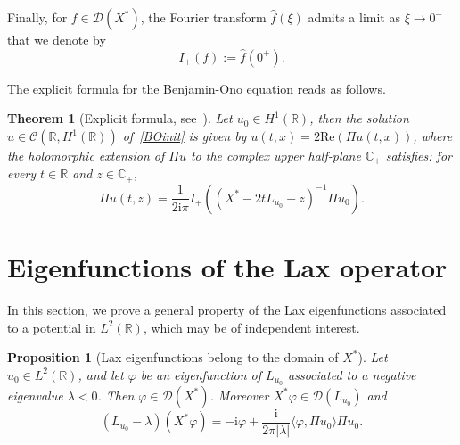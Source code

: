 \documentclass[english, 12pt]{amsart}%
\newcommand{\R}{\mathbb{R}}
\newcommand{\C}{\mathbb{C}}
\newcommand{\ii}{\mathrm{i}}
\renewcommand{\Re}{\mathrm{Re}}
\newtheorem{theorem}[definition]{Theorem}
\newtheorem{proposition}[definition]{Proposition}
\numberwithin{equation}{section}
\begin{document}
Finally, for $f\in\mathcal{D}(X^*)$, the Fourier transform $\widehat{f}(\xi)$ admits a limit as $\xi\to 0^+$ that we denote by
\[
I_+(f):=\widehat{f}(0^+).
\]

The explicit formula for the Benjamin-Ono equation reads as follows.

\begin{theorem}[Explicit formula, see~\cite{Gerard22}]
Let $u_0\in H^1(\R)$,  then the solution $u\in\mathcal{C}(\R,H^1(\R))$ of~\eqref{BOinit} is given by $u(t,x)=2\Re(\Pi u(t,x))$, where the holomorphic extension of $\Pi u$ to the complex upper half-plane $\C_+$ satisfies:  for every $t\in\R$ and $z\in\C_+$,
\begin{equation}\label{eq:explicit}
\Pi u(t,z)=\frac{1}{2\ii\pi}I_+((X^*-2tL_{u_0}-z)^{-1}\Pi u_0).
\end{equation}
\end{theorem}


\section{Eigenfunctions of the Lax operator}\label{sec:Lax}

In this section, we prove a general property of the Lax eigenfunctions associated to a potential in $L^2(\R)$, which may be of independent interest.

\begin{proposition}[Lax eigenfunctions belong to the domain of $X^*$]\label{prop:phi-domain}
Let $u_0\in L^2(\R)$, and let $\varphi$ be an eigenfunction of $L_{u_0}$ associated to a negative eigenvalue $\lambda<0$. Then $\varphi\in\mathcal{D}(X^*)$.
Moreover $X^*\varphi \in \mathcal {D}(L_{u_0})$ and 
\begin{equation}\label{eq:Xstarphi}
(L_{u_0}-\lambda)(X^*\varphi )=-\ii\varphi +\frac{\ii}{2\pi |\lambda|}\langle \varphi ,\Pi u_0\rangle \Pi u_0.
\end{equation}
\end{proposition}
\end{document}
